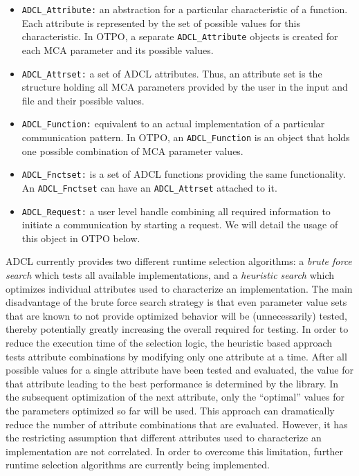 \begin{itemize}
\item {\tt ADCL\_\-Attribute:} an abstraction for a particular
  characteristic of a function. Each attribute is represented by the set of 
  possible values for this characteristic. In OTPO, a separate {\tt ADCL\_\-Attribute}
  objects is created for each MCA parameter and its possible  values.
\item {\tt ADCL\_\-Attrset:} a set of ADCL attributes. Thus, an 
  attribute set is the structure holding all MCA parameters provided by the user in the input
  and file and their possible values.
\item {\tt ADCL\_\-Function:} equivalent to an actual implementation
  of a particular communication pattern. In OTPO, an {\tt ADCL\_\-Function} is an
  object that holds one possible combination of MCA parameter values.
\item {\tt ADCL\_\-Fnctset:} is a set of ADCL functions providing the same
	functionality. An {\tt ADCL\_\-Fnctset} can have an {\tt ADCL\_\-Attrset} attached to it. 
\item {\tt ADCL\_\-Request:} a user level handle combining all required information to initiate a 
	communication by starting a request. We will detail the usage of this object in OTPO  
  below.
\end{itemize}

ADCL currently provides two different runtime selection algorithms: a
{\it brute force search} which tests all available implementations,
and a {\it heuristic search} which optimizes individual attributes
used to characterize an implementation. The main disadvantage of the
brute force search strategy is that even parameter value sets that are
known to not provide optimized behavior will be (unnecessarily)
tested, thereby potentially greatly increasing the overall required
for testing. In order to reduce the execution time of the selection
logic, the heuristic based approach tests attribute combinations by
modifying only one attribute at a time. After all possible values for
a single attribute have been tested and evaluated, the value for that
attribute leading to the best performance is determined by the
library. In the subsequent optimization of the next attribute, only
the ``optimal'' values for the parameters optimized so far will be
used. This approach can dramatically reduce the number of attribute
combinations that are evaluated. However, it has the restricting
assumption that different attributes used to characterize an
implementation are not correlated. In order to overcome this
limitation, further runtime selection algorithms are currently being
implemented.

